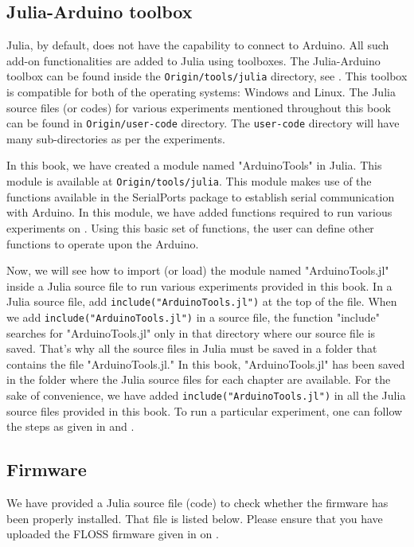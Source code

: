 \subsection{Julia-Arduino toolbox}
\label{sec:julia-toolbox}
Julia, by default, does not have the capability to connect to Arduino. 
All such add-on functionalities are added to Julia using toolboxes. 
The Julia-Arduino toolbox can be found inside the {\tt Origin/tools/julia} directory, 
see .  This toolbox is compatible for both of the operating systems: Windows and Linux. 
The Julia source files (or codes) for various experiments mentioned throughout this book can be found in 
{\tt Origin/user-code} directory. The {\tt user-code} directory will have many sub-directories as per the experiments. 

In this book, we have created a module named "ArduinoTools" in Julia.  This module is available at 
{\tt Origin/tools/julia}. This module makes use of the functions available in the SerialPorts package to 
establish serial communication with Arduino. In this module, we have added functions required to run 
various experiments on \arduino. Using this basic set of functions, the user can define other functions to operate
upon the Arduino. 


Now, we will see how to import (or load) the module named "ArduinoTools.jl" inside a Julia source file to run 
various experiments provided in this book. In a Julia source file, add {\tt include("ArduinoTools.jl")} at the top of the file. 
When we add {\tt include("ArduinoTools.jl")} in a source file, the function "include" searches for "ArduinoTools.jl" 
only in that directory where our source file is saved. That's why all the source files in Julia 
must be saved in a folder that contains the file "ArduinoTools.jl." In this book, "ArduinoTools.jl" has been saved 
in the folder where the Julia source files for each chapter are available. For the sake of convenience, we have 
added {\tt include("ArduinoTools.jl")} in all the Julia source files provided in this book. 
To run a particular experiment, one can follow the steps as given in  and . 

\subsection{Firmware}
\lstset{style=mystyle}
\label{sec:test-firmware-julia}
We have provided a Julia source file (code) to check whether the firmware has been
properly installed.  That file is listed below.  Please ensure that 
you have uploaded the FLOSS firmware given in  on \arduino.

